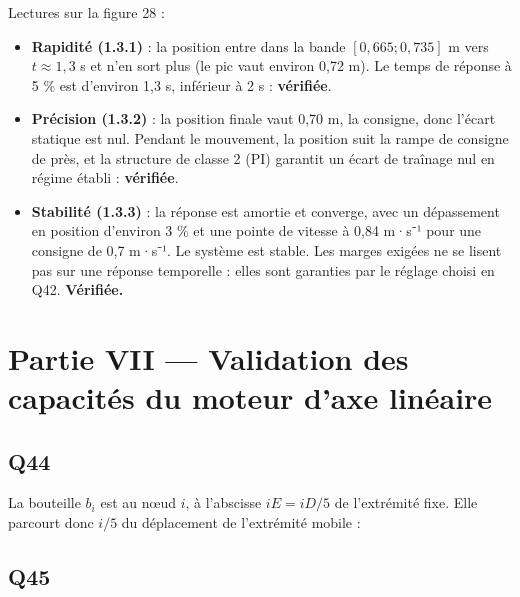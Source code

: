 \documentclass[11pt,a4paper]{article}
\providecommand{\tightlist}{\setlength{\itemsep}{0pt}\setlength{\parskip}{0pt}}
\newcommand{\equationajustee}[1]{%
  \sbox{\boiteequation}{$\displaystyle #1$}%
  \ifdim\wd\boiteequation>\linewidth
    \[\resizebox{\linewidth}{!}{\usebox{\boiteequation}}\]%
  \else
    \[#1\]%
  \fi}
\begin{document}
Lectures sur la figure 28 :

\begin{itemize}
\tightlist
\item
  \textbf{Rapidité (1.3.1)} : la position entre dans la bande \([0{,}665;0{,}735]\) m vers \(t\approx1{,}3\) s et n'en sort plus (le pic vaut environ 0,72 m). Le temps de réponse à 5 \% est d'environ 1,3 s, inférieur à 2 s : \textbf{vérifiée}.
\item
  \textbf{Précision (1.3.2)} : la position finale vaut 0,70 m, la consigne, donc l'écart statique est nul. Pendant le mouvement, la position suit la rampe de consigne de près, et la structure de classe 2 (PI) garantit un écart de traînage nul en régime établi : \textbf{vérifiée}.
\item
  \textbf{Stabilité (1.3.3)} : la réponse est amortie et converge, avec un dépassement en position d'environ 3 \% et une pointe de vitesse à 0,84 m·s⁻¹ pour une consigne de 0,7 m·s⁻¹. Le système est stable. Les marges exigées ne se lisent pas sur une réponse temporelle : elles sont garanties par le réglage choisi en Q42. \textbf{Vérifiée.}
\end{itemize}

\hypertarget{partie-vii-validation-des-capacituxe9s-du-moteur-daxe-linuxe9aire}{%
\section{Partie VII --- Validation des capacités du moteur d'axe linéaire}\label{partie-vii-validation-des-capacituxe9s-du-moteur-daxe-linuxe9aire}}

\hypertarget{q44}{%
\subsection{Q44}\label{q44}}

La bouteille \(b_i\) est au nœud \(i\), à l'abscisse \(iE=iD/5\) de l'extrémité fixe. Elle parcourt donc \(i/5\) du déplacement de l'extrémité mobile :

\equationajustee{\boxed{\begin{aligned}
V_{b_1}&=\frac{\dot\lambda}{5}\\
V_{b_2}&=\frac{2\dot\lambda}{5}\\
V_{b_3}&=\frac{3\dot\lambda}{5}\\
V_{b_4}&=\frac{4\dot\lambda}{5}
\end{aligned}}}

\hypertarget{q45}{%
\subsection{Q45}\label{q45}}
\end{document}
